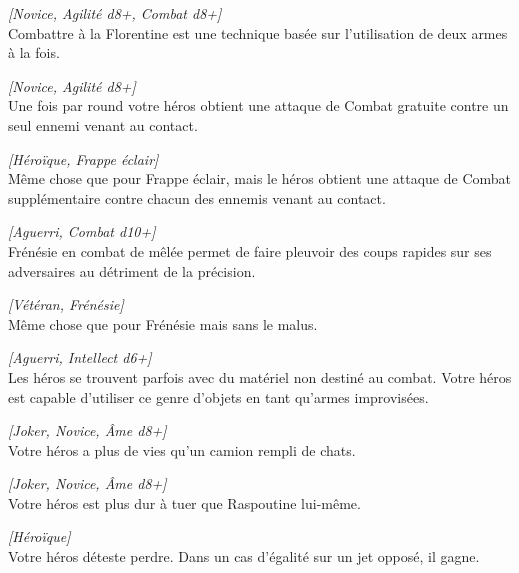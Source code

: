 \begin{description}[align=left]
    \item [Florentine]
    	\emph{[Novice, Agilité d8+, Combat d8+]}\\
        Combattre à la Florentine est une technique basée sur l’utilisation de deux armes à la fois.

    \item [Frappe éclair]
    	\emph{[Novice, Agilité d8+]}\\
        Une fois par round votre héros obtient une attaque de Combat gratuite contre un seul ennemi venant au contact.

    \item [Frappe foudroyante]
    	\emph{[Héroïque, Frappe éclair]}\\
        Même chose que pour Frappe éclair, mais le héros obtient une attaque de Combat supplémentaire contre chacun des ennemis venant au contact.

    \item [Frénésie]
    	\emph{[Aguerri, Combat d10+]}\\
        Frénésie en combat de mêlée permet de faire pleuvoir des coups rapides sur ses adversaires au détriment de la précision.

    \item [Frénésie suprême]
    	\emph{[Vétéran, Frénésie]}\\
        Même chose que pour Frénésie mais sans le malus.

    \item [Improvisation martiale]
    	\emph{[Aguerri, Intellect d6+]}\\
        Les héros se trouvent parfois avec du matériel non destiné au combat. Votre héros est capable d’utiliser ce genre d’objets en tant qu’armes improvisées.

    \item [Increvable]
    	\emph{[Joker, Novice, Âme d8+]}\\
        Votre héros a plus de vies qu’un camion rempli de chats.

    \item [Trompe-la-mort]
    	\emph{[Joker, Novice, Âme d8+]}\\
        Votre héros est plus dur à tuer que Raspoutine lui-même.

    \item [Instinct de tueur]
    	\emph{[Héroïque]}\\
        Votre héros déteste perdre. Dans un cas d’égalité sur un jet opposé, il gagne.


\end{description}
